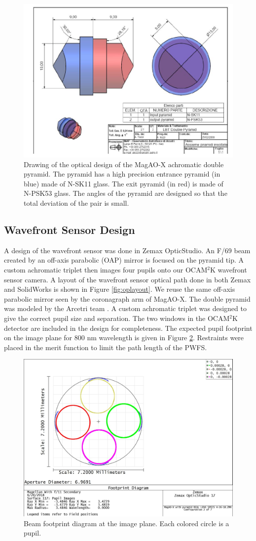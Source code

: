 \begin{figure}
    \centering
    \includegraphics[width=.6\textwidth]{Chapter Materials/Chapter Three Materials/pyramidprismfull.JPG}
    \caption{Drawing of the optical design of the MagAO-X achromatic double pyramid. The pyramid has a high precision entrance pyramid (in blue) made of N-SK11 glass. The exit pyramid (in red) is made of N-PSK53 glass. The angles of the pyramid are designed so that the total deviation of the pair is small.}
    \label{fig:fullpyramidprism}
\end{figure}
	
	
	
\subsection{Wavefront Sensor Design}
	
A design of the wavefront sensor was done in Zemax OpticStudio. An F/69 beam created by an off-axis parabolic (OAP) mirror is focused on the pyramid tip. A custom achromatic triplet then images four pupils onto our OCAM$^2$K wavefront sensor camera. A layout of the wavefront sensor optical path done in both Zemax and SolidWorks is shown in Figure \ref{fig:oplayout}. We reuse the same off-axis parabolic mirror seen by the coronagraph arm of MagAO-X. The double pyramid was modeled by the Arcetri team \citep{tozzi2008double}. A custom achromatic triplet was designed to give the correct pupil size and separation. The two windows in the OCAM$^2$K detector are included in the design for completeness. The expected pupil footprint on the image plane for 800 nm wavelength is given in Figure \ref{fig:footprint}. Restraints were placed in the merit function to limit the path length of the PWFS. 

\begin{figure}[h]
	\centering
	\includegraphics[width=.5\textwidth]{Chapter Materials/Chapter Three Materials/Pupils6-20-18.jpg}
	\caption{Beam footprint diagram at the image plane. Each colored circle is a pupil.}
	\label{fig:footprint}
\end{figure}

